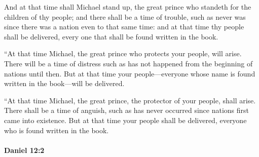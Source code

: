 			\begin{versebox}
					\item[BHS] 
					\item[LXX] 
					\item[ASV] And at that time shall Michael stand up, the great prince who standeth for the children of thy people; and there shall be a time of trouble, such as never was since there was a nation even to that same time: and at that time thy people shall be delivered, every one that shall be found written in the book.
					\item[NIV] “At that time Michael, the great prince who protects your people, will arise. There will be a time of distress such as has not happened from the beginning of nations until then. But at that time your people—everyone whose name is found written in the book—will be delivered.
					\item[NRSV] “At that time Michael, the great prince, the protector of your people, shall arise. There shall be a time of anguish, such as has never occurred since nations first came into existence. But at that time your people shall be delivered, everyone who is found written in the book.
			\end{versebox}

		\paragraph{Daniel 12:2} %
			\label{DANIEL-12-2}

